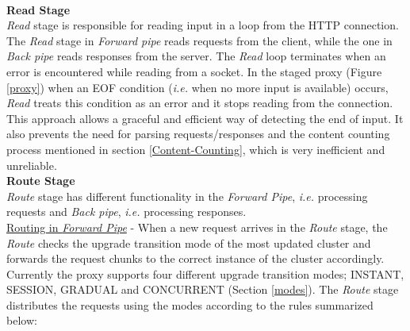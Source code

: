 \documentclass[a4paper,11pt,twoside]{article}
\begin{document}
\noindent\\
\textbf{Read Stage} \\
\textit{Read} stage is responsible for reading input in a loop from the HTTP connection. The \textit{Read} stage in \textit{Forward pipe} reads requests from the client, while the one in \textit{Back pipe} reads responses from the server. The \textit{Read} loop terminates when an error is encountered while reading from a socket. In the staged proxy (Figure \ref{proxy}) when an EOF condition (\textit{i.e.} when no more input is available)  occurs, \textit{Read} treats this condition as an error and it stops reading from the connection. This approach allows a graceful and efficient way of detecting the end of input. It also prevents the need for parsing requests/responses and the content counting process mentioned in section \ref{Content-Counting}, which is very inefficient and unreliable.\\

\noindent
\textbf{Route Stage} \\
\textit{Route} stage has different functionality in the \textit{Forward Pipe}, \textit{i.e.} processing requests and \textit{Back pipe}, \textit{i.e.} processing responses. \\   

\noindent
\underline{Routing in \textit{Forward Pipe}} - When a new request arrives in the \textit{Route} stage, the \textit{Route} checks the upgrade transition mode of the most updated cluster and forwards the request chunks to the correct instance of the cluster accordingly. Currently the proxy supports four different upgrade transition modes; INSTANT, SESSION, GRADUAL and CONCURRENT (Section \ref{modes}). The \textit{Route} stage distributes the requests using the modes according to the rules summarized below: 
\end{document}
